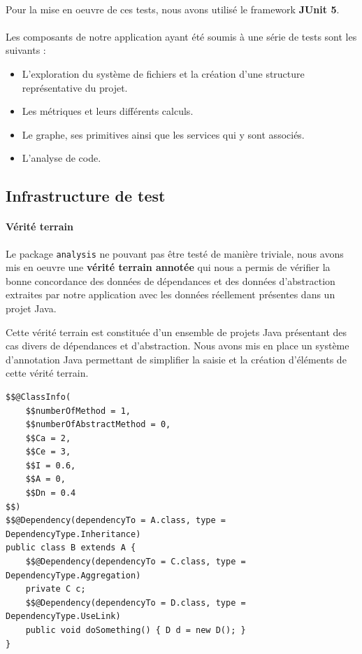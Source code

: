 \documentclass{scrartcl}
\begin{document}
    \paragraph{}Pour la mise en oeuvre de ces tests, nous avons utilisé le framework \textbf{JUnit 5}.
    
    \paragraph{}Les composants de notre application ayant été soumis à une série de tests sont les suivants : 
    \begin{itemize}
    	\item L'exploration du système de fichiers et la création d'une structure représentative du projet.
    	\item Les métriques et leurs différents calculs.
    	\item Le graphe, ses primitives ainsi que les services qui y sont associés.
    	\item L’analyse de code.
    \end{itemize}

\subsection{Infrastructure de test}

    \paragraph{Vérité terrain}Le package \texttt{analysis} ne pouvant pas être testé de manière triviale, nous avons mis en oeuvre une \textbf{vérité terrain annotée} qui nous a permis de vérifier la bonne concordance des données de dépendances et des données d’abstraction extraites par notre application avec les données réellement présentes dans un projet Java.
    
    Cette vérité terrain est constituée d’un ensemble de projets Java présentant des cas divers de dépendances et d'abstraction. Nous avons mis en place un système d’annotation Java permettant de simplifier la saisie et la création d'éléments de cette vérité terrain.
    
\begin{lstlisting}[caption={Exemple de classe annotée}]
$$@ClassInfo(
    $$numberOfMethod = 1,
    $$numberOfAbstractMethod = 0,
    $$Ca = 2,
    $$Ce = 3,
    $$I = 0.6,
    $$A = 0,
    $$Dn = 0.4
$$)
$$@Dependency(dependencyTo = A.class, type = DependencyType.Inheritance)
public class B extends A {
    $$@Dependency(dependencyTo = C.class, type = DependencyType.Aggregation)
    private C c;
    $$@Dependency(dependencyTo = D.class, type = DependencyType.UseLink)
    public void doSomething() { D d = new D(); }
}
\end{lstlisting}
\end{document}
